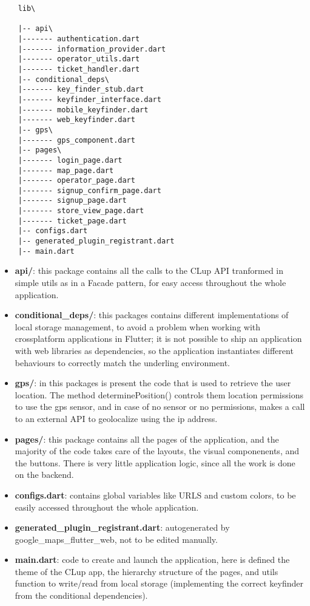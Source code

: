 \begin{lstlisting}
    lib\

    |-- api\
    |------- authentication.dart
    |------- information_provider.dart
    |------- operator_utils.dart
    |------- ticket_handler.dart
    |-- conditional_deps\
    |------- key_finder_stub.dart
    |------- keyfinder_interface.dart
    |------- mobile_keyfinder.dart
    |------- web_keyfinder.dart
    |-- gps\
    |------- gps_component.dart
    |-- pages\
    |------- login_page.dart
    |------- map_page.dart
    |------- operator_page.dart
    |------- signup_confirm_page.dart
    |------- signup_page.dart
    |------- store_view_page.dart
    |------- ticket_page.dart
    |-- configs.dart
    |-- generated_plugin_registrant.dart
    |-- main.dart

\end{lstlisting}

\begin{itemize}
    \item \textbf{api/}: this package contains all the calls to the CLup API tranformed in simple utils as in a Facade pattern, for easy access throughout the whole application.
    \item \textbf{conditional\_deps/}: this packages contains different implementations of local storage management, to avoid a problem when working with crossplatform applications in Flutter; it is not possible to ship an application with web libraries as dependencies, so the application instantiates different behaviours to correctly match the underling environment.
    \item \textbf{gps/}: in this packages is present the code that is used to retrieve the user location. The method determinePosition() controls them location permissions to use the gps sensor, and in case of no sensor or no permissions, makes a call to an external API to geolocalize using the ip address.
    \item \textbf{pages/}: this package contains all the pages of the application, and the majority of the code takes care of the layouts, the visual componenents, and the buttons. There is very little application logic, since all the work is done on the backend.
    \item \textbf{configs.dart}: contains global variables like URLS and custom colors, to be easily accessed throughout the whole application.
    \item \textbf{generated\_plugin\_registrant.dart}: autogenerated by google\_maps\_flutter\_web, not to be edited manually.
    \item \textbf{main.dart}: code to create and launch the application, here is defined the theme of the CLup app, the hierarchy structure of the pages, and utils function to write/read from local storage (implementing the correct keyfinder from the conditional dependencies).
\end{itemize}